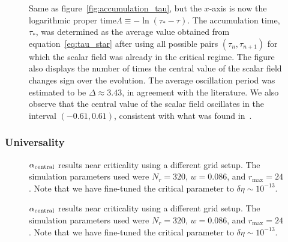 \documentclass[a4paper,11pt]{article}
\renewcommand{\d}{\delta}
\newcommand{\D}{\Delta}
\newcommand{\lrpar}[1]{\left( #1 \right)}
\begin{document}
\begin{figure}[htt]
  \centering
  
  \caption[Central value of the scalar field, $\phi_{\rm central}$, near criticality as a function of logarithmic proper time, $\Lambda$.]{Same as figure~\ref{fig:accumulation_tau}, but the $x$-axis is now the logarithmic proper time\linebreak $\Lambda\equiv-\ln\lrpar{\tau_{*}-\tau}$. The accumulation time, $\tau_{*}$, was determined as the average value obtained from equation~\eqref{eq:tau_star} after using all possible pairs $\lrpar{\tau_{n},\tau_{n+1}}$ for which the scalar field was already in the critical regime. The figure also displays the number of times the central value of the scalar field changes sign over the evolution. The average oscillation period was estimated to be $\D \approx 3.43$, in agreement with the literature. We also observe that the central value of the scalar field oscillates in the interval $\lrpar{-0.61,0.61}$, consistent with what was found in~\cite{PhysRevLett.70.9,PhysRevD.92.084037,Baumgarte_2018}.}
  \label{fig:accumulation_Lambda}
\end{figure}

\subsubsection{Universality}

\begin{figure}[H]
  \centering
  
  \caption[$\alpha_{\rm central}$ results near criticality using a different grid setup.]{$\alpha_{\rm central}$ results near criticality using a different grid setup. The simulation parameters used were $N_{r}=320$, $w=0.086$, and $r_{\max}=24$. Note that we have fine-tuned the critical parameter to $\d\eta\sim10^{-13}$.}
  \label{fig:critical_alpha_v2}
\end{figure}

\begin{figure}[H]
  \centering
  
  \caption[$\alpha_{\rm central}$ results near criticality using a different grid setup.]{$\alpha_{\rm central}$ results near criticality using a different grid setup. The simulation parameters used were $N_{r}=320$, $w=0.086$, and $r_{\max}=24$. Note that we have fine-tuned the critical parameter to $\d\eta\sim10^{-13}$.}
  \label{fig:critical_alpha_tanh}
\end{figure}

\setlength{\abovecaptionskip}{16pt plus 0pt minus 0pt}
\end{document}
